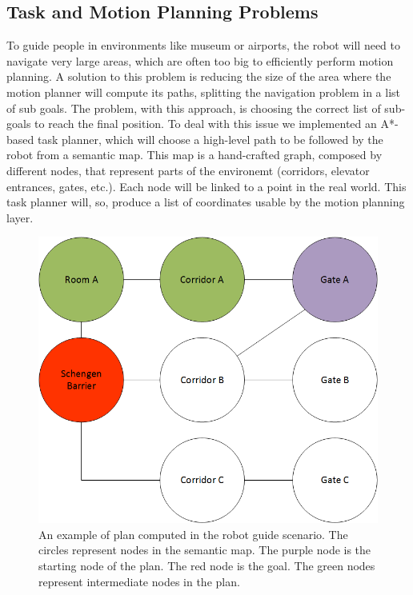 \subsection{Task and Motion Planning Problems}
\label{subsec:case_study-spencer-planning}
To guide people in environments like museum or airports, the robot will need to navigate very large areas, which are often too big to efficiently perform motion planning. A solution to this problem is reducing the size of the area where the motion planner will compute its paths, splitting the navigation problem in a list of sub goals. The problem, with this approach,  is choosing the correct list of sub-goals to reach the final position.  To deal with this issue we implemented an A*-based task planner, which will choose a high-level path to be followed by the robot from a semantic map. This map is a hand-crafted graph, composed by different nodes, that represent parts of the environemt (corridors, elevator entrances, gates, etc.). Each node will be linked to a point in the real world. This task planner will, so, produce a list of coordinates usable by the motion planning layer. 

\begin{figure}[ht!]
	\centering
	\includegraphics[scale=0.45]{img/case_study/spencer/ShengenTaskPlanner.png}
	\caption[Robot Guide Plan]{An example of plan computed in the robot guide scenario. The circles represent nodes in the semantic map. The purple node is the starting node of the plan. The red node is the goal. The green nodes represent intermediate nodes in the plan.}
	\label{fig:case_study-spencer-semantic_plan}
\end{figure}


